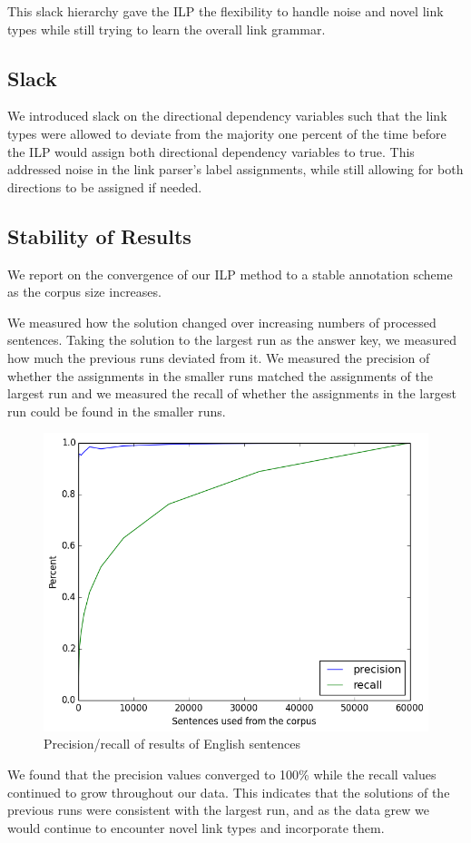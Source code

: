 \documentclass[11pt]{article}
\begin{document}
This slack hierarchy gave the ILP the flexibility to handle noise and novel link types while still trying to learn the overall link grammar.


\subsection{Slack}
We introduced slack on the directional dependency variables such that the link types were allowed to deviate from the majority one percent of the time before the ILP would assign both directional dependency variables to true. This addressed noise in the link parser's label assignments, while still allowing for both directions to be assigned if needed.


\subsection{Stability of Results}

We report on the convergence of our ILP method to a stable annotation scheme as the corpus size increases.


We measured how the solution changed over increasing numbers of processed sentences. 
Taking the solution to the largest run as the answer key, we measured how much the previous runs deviated from it. We measured the precision of whether the assignments in the smaller runs matched the assignments of the largest run and we measured the recall of whether the assignments in the largest run could be found in the smaller runs. 
\begin{figure}[ht!]
  \small
  \includegraphics[width=\linewidth, keepaspectratio=true]{figure/precision_recall.png}
  \caption{\small Precision/recall of results of English sentences}
\end{figure}
We found that the precision values converged to 100\% while the recall values continued to grow throughout our data. This indicates that the solutions of the previous runs were consistent with the largest run, and as the data grew we would continue to encounter novel link types and incorporate them.
\end{document}
